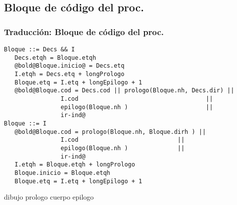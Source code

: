 \documentclass[hyperref={pdfpagelabels=false},tree-dvips,compress]{beamer}
\begin{document}
\subsection{Bloque de código del proc.}
\begin{frame}[fragile]
\frametitle{Traducción: Bloque de código del proc.}

\begin{lstlisting}[style=gramaticas,basicstyle=\scriptsize\ttfamily,mathescape]
Bloque ::= Decs && I
   Decs.etqh = Bloque.etqh
   @bold@Bloque.inicio@ = Decs.etq
   I.etqh = Decs.etq + longPrologo
   Bloque.etq = I.etq + longEpilogo + 1
   @bold@Bloque.cod = Decs.cod || prologo(Bloque.nh, Decs.dir) ||
                I.cod                                    ||
                epilogo(Bloque.nh )                      ||
                ir-ind@
Bloque ::= I
   @bold@Bloque.cod = prologo(Bloque.nh, Bloque.dirh ) ||
                I.cod                            ||
                epilogo(Bloque.nh )              ||
                ir-ind@
   I.etqh = Bloque.etqh + longPrologo
   Bloque.inicio = Bloque.etqh
   Bloque.etq = I.etq + longEpilogo + 1
\end{lstlisting}

dibujo prologo cuerpo epilogo

\end{frame}
\end{document}
